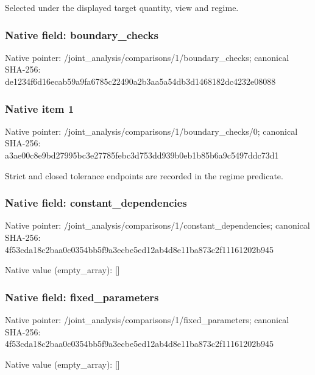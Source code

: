 \documentclass[10pt,a4paper]{article}
\begin{document}
Selected under the displayed target quantity, view and regime.


\subsubsection{Native field: boundary\_checks}


Native pointer: /joint\_analysis/comparis\allowbreak{}ons/1/boundary\_checks; canonical SHA-256: de1234f6d16ecab59a9fa678\allowbreak{}5c22490a2b3aa5a54db3d146\allowbreak{}8182dc4232e08088



\subsubsection{Native item 1}


Native pointer: /joint\_analysis/comparis\allowbreak{}ons/1/boundary\_checks/0; canonical SHA-256: a3ae00c8e9bd27995bc3e277\allowbreak{}85febc3d753dd939b0eb1b85\allowbreak{}b6a9c5497ddc73d1


Strict and closed tolerance endpoints are recorded in the regime predicate.


\subsubsection{Native field: constant\_dependencies}


Native pointer: /joint\_analysis/comparis\allowbreak{}ons/1/constant\_dependenc\allowbreak{}ies; canonical SHA-256: 4f53cda18c2baa0c0354bb5f\allowbreak{}9a3ecbe5ed12ab4d8e11ba87\allowbreak{}3c2f11161202b945



Native value (empty\_array): []



\subsubsection{Native field: fixed\_parameters}


Native pointer: /joint\_analysis/comparis\allowbreak{}ons/1/fixed\_parameters; canonical SHA-256: 4f53cda18c2baa0c0354bb5f\allowbreak{}9a3ecbe5ed12ab4d8e11ba87\allowbreak{}3c2f11161202b945



Native value (empty\_array): []
\end{document}
